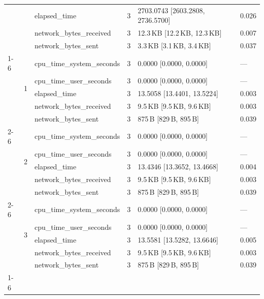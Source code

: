 \begin{tabular}{lllrll}
 &  & elapsed_time & 3 & 2703.0743 [2603.2808, 2736.5700] & 0.026 \\
 &  & network_bytes_received & 3 & 12.3\,KB [12.2\,KB, 12.3\,KB] & 0.007 \\
 &  & network_bytes_sent & 3 & 3.3\,KB [3.1\,KB, 3.4\,KB] & 0.037 \\
\cline{1-6} \cline{2-6}
\multirow[t]{15}{*}{national-scale-spatial-join-postgis-small} & \multirow[t]{5}{*}{1} & cpu_time_system_seconds & 3 & 0.0000 [0.0000, 0.0000] & --- \\
 &  & cpu_time_user_seconds & 3 & 0.0000 [0.0000, 0.0000] & --- \\
 &  & elapsed_time & 3 & 13.5058 [13.4401, 13.5224] & 0.003 \\
 &  & network_bytes_received & 3 & 9.5\,KB [9.5\,KB, 9.6\,KB] & 0.003 \\
 &  & network_bytes_sent & 3 & 875\,B [829\,B, 895\,B] & 0.039 \\
\cline{2-6}
 & \multirow[t]{5}{*}{2} & cpu_time_system_seconds & 3 & 0.0000 [0.0000, 0.0000] & --- \\
 &  & cpu_time_user_seconds & 3 & 0.0000 [0.0000, 0.0000] & --- \\
 &  & elapsed_time & 3 & 13.4346 [13.3652, 13.4668] & 0.004 \\
 &  & network_bytes_received & 3 & 9.5\,KB [9.5\,KB, 9.6\,KB] & 0.003 \\
 &  & network_bytes_sent & 3 & 875\,B [829\,B, 895\,B] & 0.039 \\
\cline{2-6}
 & \multirow[t]{5}{*}{3} & cpu_time_system_seconds & 3 & 0.0000 [0.0000, 0.0000] & --- \\
 &  & cpu_time_user_seconds & 3 & 0.0000 [0.0000, 0.0000] & --- \\
 &  & elapsed_time & 3 & 13.5581 [13.5282, 13.6646] & 0.005 \\
 &  & network_bytes_received & 3 & 9.5\,KB [9.5\,KB, 9.6\,KB] & 0.003 \\
 &  & network_bytes_sent & 3 & 875\,B [829\,B, 895\,B] & 0.039 \\
\cline{1-6} \cline{2-6}
\bottomrule
\end{tabular}
